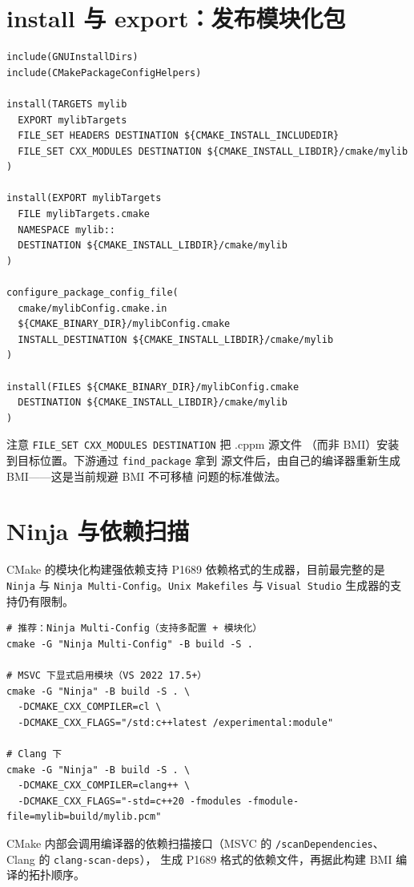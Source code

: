 \documentclass[12pt,a4paper,fontset=fandol]{ctexbook}
\newcommand{\cmakelabel}{%
  \tcbox[on line,colback=cppheadbg!80!black,colframe=cppheadbg!80!black,
    boxrule=0pt,arc=1pt,left=2pt,right=2pt,top=1pt,bottom=1pt,
    colupper=white,fontupper=\scriptsize\bfseries]{CMake}}
\newcommand{\shelllabel}{%
  \tcbox[on line,colback=bashheadbg,colframe=bashheadbg,
    boxrule=0pt,arc=1pt,left=2pt,right=2pt,top=1pt,bottom=1pt,
    colupper=white,fontupper=\scriptsize\bfseries]{Shell}}
\newcommand{\flag}[1]{\texttt{#1}}
\begin{document}
\section{install 与 export：发布模块化包}

\cmakelabel
\begin{lstlisting}[style=cmakestyle]
include(GNUInstallDirs)
include(CMakePackageConfigHelpers)

install(TARGETS mylib
  EXPORT mylibTargets
  FILE_SET HEADERS DESTINATION ${CMAKE_INSTALL_INCLUDEDIR}
  FILE_SET CXX_MODULES DESTINATION ${CMAKE_INSTALL_LIBDIR}/cmake/mylib
)

install(EXPORT mylibTargets
  FILE mylibTargets.cmake
  NAMESPACE mylib::
  DESTINATION ${CMAKE_INSTALL_LIBDIR}/cmake/mylib
)

configure_package_config_file(
  cmake/mylibConfig.cmake.in
  ${CMAKE_BINARY_DIR}/mylibConfig.cmake
  INSTALL_DESTINATION ${CMAKE_INSTALL_LIBDIR}/cmake/mylib
)

install(FILES ${CMAKE_BINARY_DIR}/mylibConfig.cmake
  DESTINATION ${CMAKE_INSTALL_LIBDIR}/cmake/mylib
)
\end{lstlisting}

注意 \flag{FILE\_SET CXX\_MODULES DESTINATION} 把 .cppm 源文件
（而非 BMI）安装到目标位置。下游通过 \flag{find\_package} 拿到
源文件后，由自己的编译器重新生成 BMI——这是当前规避 BMI 不可移植
问题的标准做法。

\section{Ninja 与依赖扫描}

CMake 的模块化构建强依赖支持 P1689 依赖格式的生成器，目前最完整的是
\flag{Ninja} 与 \flag{Ninja Multi-Config}。\flag{Unix Makefiles} 与
\flag{Visual Studio} 生成器的支持仍有限制。

\shelllabel
\begin{lstlisting}[style=bashstyle]
# 推荐：Ninja Multi-Config（支持多配置 + 模块化）
cmake -G "Ninja Multi-Config" -B build -S .

# MSVC 下显式启用模块（VS 2022 17.5+）
cmake -G "Ninja" -B build -S . \
  -DCMAKE_CXX_COMPILER=cl \
  -DCMAKE_CXX_FLAGS="/std:c++latest /experimental:module"

# Clang 下
cmake -G "Ninja" -B build -S . \
  -DCMAKE_CXX_COMPILER=clang++ \
  -DCMAKE_CXX_FLAGS="-std=c++20 -fmodules -fmodule-file=mylib=build/mylib.pcm"
\end{lstlisting}

CMake 内部会调用编译器的依赖扫描接口（MSVC 的
\flag{/scanDependencies}、Clang 的 \flag{clang-scan-deps}），
生成 P1689 格式的依赖文件，再据此构建 BMI 编译的拓扑顺序。
\end{document}
